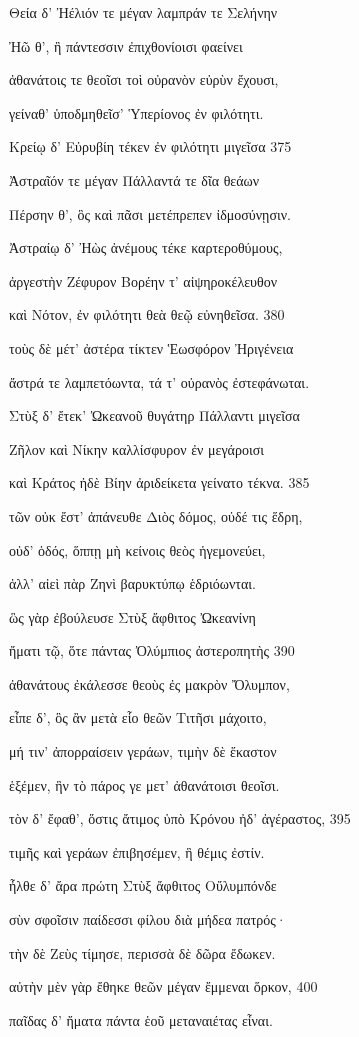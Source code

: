 Θεία δ' Ἠέλιόν τε μέγαν λαμπράν τε Σελήνην 

Ἠῶ θ', ἣ πάντεσσιν ἐπιχθονίοισι φαείνει

ἀθανάτοις τε θεοῖσι τοὶ οὐρανὸν εὐρὺν ἔχουσι,

γείναθ' ὑποδμηθεῖσ' Ὑπερίονος ἐν φιλότητι. 

Κρείῳ δ' Εὐρυβίη τέκεν ἐν φιλότητι μιγεῖσα 375 

Ἀστραῖόν τε μέγαν Πάλλαντά τε δῖα θεάων

Πέρσην θ', ὃς καὶ πᾶσι μετέπρεπεν ἰδμοσύνῃσιν.

Ἀστραίῳ δ' Ἠὼς ἀνέμους τέκε καρτεροθύμους,

ἀργεστὴν Ζέφυρον Βορέην τ' αἰψηροκέλευθον 

καὶ Νότον, ἐν φιλότητι θεὰ θεῷ εὐνηθεῖσα. 380

τοὺς δὲ μέτ' ἀστέρα τίκτεν Ἑωσφόρον Ἠριγένεια

ἄστρά τε λαμπετόωντα, τά τ' οὐρανὸς ἐστεφάνωται. 

Στὺξ δ' ἔτεκ' Ὠκεανοῦ θυγάτηρ Πάλλαντι μιγεῖσα

Ζῆλον καὶ Νίκην καλλίσφυρον ἐν μεγάροισι 

καὶ Κράτος ἠδὲ Βίην ἀριδείκετα γείνατο τέκνα. 385 

τῶν οὐκ ἔστ' ἀπάνευθε Διὸς δόμος, οὐδέ τις ἕδρη,

οὐδ' ὁδός, ὅππῃ μὴ κείνοις θεὸς ἡγεμονεύει,

ἀλλ' αἰεὶ πὰρ Ζηνὶ βαρυκτύπῳ ἑδριόωνται.

ὣς γὰρ ἐβούλευσε Στὺξ ἄφθιτος Ὠκεανίνη

ἤματι τῷ, ὅτε πάντας Ὀλύμπιος ἀστεροπητὴς 390

ἀθανάτους ἐκάλεσσε θεοὺς ἐς μακρὸν Ὄλυμπον,

εἶπε δ', ὃς ἂν μετὰ εἷο θεῶν Τιτῆσι μάχοιτο,

μή τιν' ἀπορραίσειν γεράων, τιμὴν δὲ ἕκαστον

ἑξέμεν, ἣν τὸ πάρος γε μετ' ἀθανάτοισι θεοῖσι.

τὸν δ' ἔφαθ', ὅστις ἄτιμος ὑπὸ Κρόνου ἠδ' ἀγέραστος, 395

τιμῆς καὶ γεράων ἐπιβησέμεν, ἣ θέμις ἐστίν.

ἦλθε δ' ἄρα πρώτη Στὺξ ἄφθιτος Οὔλυμπόνδε

σὺν σφοῖσιν παίδεσσι φίλου διὰ μήδεα πατρός· 

τὴν δὲ Ζεὺς τίμησε, περισσὰ δὲ δῶρα ἔδωκεν.

αὐτὴν μὲν γὰρ ἔθηκε θεῶν μέγαν ἔμμεναι ὅρκον, 400

παῖδας δ' ἤματα πάντα ἑοῦ μεταναιέτας εἶναι.

